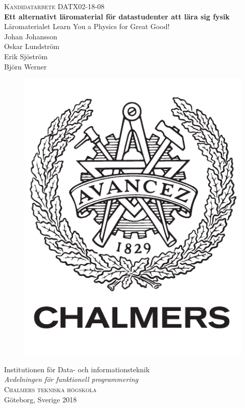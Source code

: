 \newpage
\restoregeometry
\thispagestyle{empty}
\mbox{}


\newpage
\thispagestyle{empty}
\begin{center}
	\textsc{\large Kandidatarbete DATX02-18-08}\\[4cm]		%
	\textbf{\Large Ett alternativt läromaterial för datastudenter att lära sig fysik} \\[1cm]
	{\large Läromaterialet Learn You a Physics for Great Good!}\\[1cm]
	{\large Johan Johansson}\\
  {\large Oskar Lundström}\\
 	{\large Erik Sjöström}\\
  {\large Björn Werner}\\

	\vfill
	\begin{figure}[H]
	\centering
	\includegraphics[width=0.2\pdfpagewidth]{figure/auxiliary/logo_swe.pdf} \\
	\end{figure}	\vspace{5mm}

	Institutionen för Data- och informationsteknik \\
	\emph{Avdelningen för funktionell programmering}\\
	\textsc{Chalmers tekniska högskola} \\
	Göteborg, Sverige 2018 \\
\end{center}


